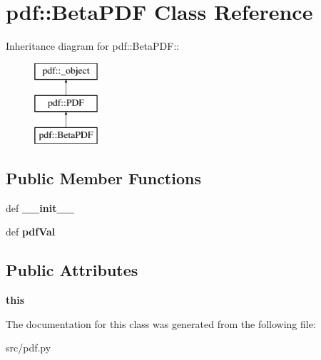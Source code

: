 \hypertarget{classpdf_1_1BetaPDF}{
\section{pdf::BetaPDF Class Reference}
\label{d4/dae/classpdf_1_1BetaPDF}
}
Inheritance diagram for pdf::BetaPDF::\begin{figure}[H]
\begin{center}
\leavevmode
\includegraphics[height=3cm]{d4/dae/classpdf_1_1BetaPDF}
\end{center}
\end{figure}
\subsection*{Public Member Functions}
\begin{DoxyCompactItemize}
\item 
\hypertarget{classpdf_1_1BetaPDF_a20df6a985b59544305063ed17b7358c5}{
def {\bfseries \_\-\_\-init\_\-\_\-}}
\label{d4/dae/classpdf_1_1BetaPDF_a20df6a985b59544305063ed17b7358c5}

\item 
\hypertarget{classpdf_1_1BetaPDF_ad7f9b56263693e180c38d788048299f0}{
def {\bfseries pdfVal}}
\label{d4/dae/classpdf_1_1BetaPDF_ad7f9b56263693e180c38d788048299f0}

\end{DoxyCompactItemize}
\subsection*{Public Attributes}
\begin{DoxyCompactItemize}
\item 
\hypertarget{classpdf_1_1BetaPDF_afec5aec12f1405624850046968b2bbec}{
{\bfseries this}}
\label{d4/dae/classpdf_1_1BetaPDF_afec5aec12f1405624850046968b2bbec}

\end{DoxyCompactItemize}


The documentation for this class was generated from the following file:\begin{DoxyCompactItemize}
\item 
src/pdf.py\end{DoxyCompactItemize}
